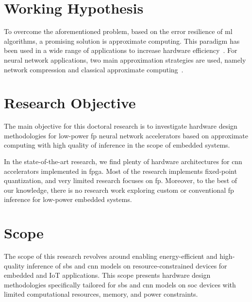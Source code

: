 \section{Working Hypothesis}
To overcome the aforementioned problem, based on the error resilience of \gls{ml} algorithms, a promising solution is approximate computing. This paradigm has been used in a wide range of applications to increase hardware efficiency~\cite{han2013approximate}. For neural network applications, two main approximation strategies are used, namely network compression and classical approximate computing~\cite{bouvier2019spiking}.

\section{Research Objective}
The main objective for this doctoral research is to investigate hardware design methodologies for low-power \gls{fp} neural network accelerators based on approximate computing with high quality of inference in the scope of embedded systems.

In the state-of-the-art research, we find plenty of hardware architectures for \gls{cnn} accelerators implemented in \gls{fpga}. Most of the research implements fixed-point quantization, and very limited research focuses on \gls{fp}. Moreover, to the best of our knowledge, there is no research work exploring custom or conventional \gls{fp} inference for low-power embedded systems.


\section{Scope}\label{chap1.scope}
The scope of this research revolves around enabling energy-efficient and high-quality inference of \gls{sbs} and \gls{cnn} models on resource-constrained devices for embedded and IoT applications. This scope presents hardware design methodologies specifically tailored for \gls{sbs} and \gls{cnn} models on \gls{soc} devices with limited computational resources, memory, and power constraints.



